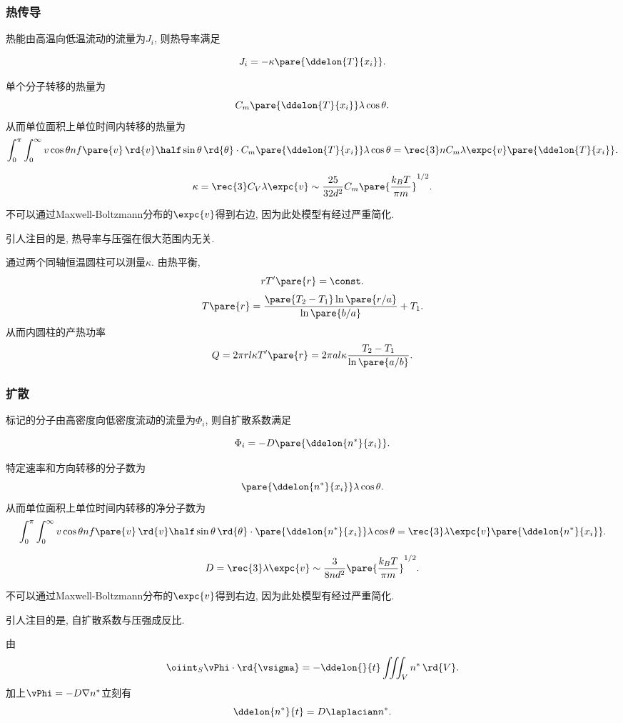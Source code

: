 \documentclass[../Thermal.tex]{subfiles}
\begin{document}
\subsubsection{热传导}
\begin{definition}[热导率]
热能由高温向低温流动的流量为$J_i$, 则热导率满足
\begin{finale}
\[ J_i = -\kappa \pare{\ddelon{T}{x_i}}. \]
\end{finale}
\end{definition}
单个分子转移的热量为
\[ C_m \pare{\ddelon{T}{x_i}}\lambda\cos\theta. \]
从而单位面积上单位时间内转移的热量为
\[ \int_0^\pi\int_0^\infty v\cos\theta nf\pare{v}\,\rd{v}\half\sin\theta\,\rd{\theta}\cdot C_m \pare{\ddelon{T}{x_i}}\lambda\cos\theta = \rec{3}nC_m\lambda\expc{v}\pare{\ddelon{T}{x_i}}. \]
\begin{finale}
\[ \kappa = \rec{3}C_V\lambda\expc{v} \sim \frac{25}{32d^2}C_m\pare{\frac{k_BT}{\pi m}}^{1/2}. \]
\end{finale}
\begin{pitfall}
不可以通过Maxwell-Boltzmann分布的$\expc{v}$得到右边, 因为此处模型有经过严重简化.
\end{pitfall}
引人注目的是, 热导率与压强在很大范围内无关.
\begin{ex}
通过两个同轴恒温圆柱可以测量$\kappa$. 由热平衡,
\[ rT'\pare{r} = \const. \]
\[ T\pare{r} = \frac{\pare{T_2-T_1}\ln\pare{r/a}}{\ln\pare{b/a}} + T_1. \]
从而内圆柱的产热功率
\[ Q = 2\pi rl\kappa T'\pare{r} = 2\pi al\kappa\frac{T_2-T_1}{\ln\pare{a/b}}. \]
\end{ex}
\subsubsection{扩散}
\begin{definition}[自扩散系数]
标记的分子由高密度向低密度流动的流量为$\Phi_i$, 则自扩散系数满足
\begin{finale}
\[ \Phi_i = -D\pare{\ddelon{n^*}{x_i}}. \]
\end{finale}
\end{definition}
特定速率和方向转移的分子数为
\[ \pare{\ddelon{n^*}{x_i}}\lambda\cos\theta. \]
从而单位面积上单位时间内转移的净分子数为
\[ \int_0^\pi\int_0^\infty v\cos\theta nf\pare{v}\,\rd{v}\half\sin\theta\,\rd{\theta}\cdot \pare{\ddelon{n^*}{x_i}}\lambda\cos\theta = \rec{3}\lambda\expc{v}\pare{\ddelon{n^*}{x_i}}. \]
\begin{finale}
\[ D = \rec{3}\lambda\expc{v} \sim \frac{3}{8nd^2}\pare{\frac{k_BT}{\pi m}}^{1/2}. \]
\end{finale}
\begin{pitfall}
不可以通过Maxwell-Boltzmann分布的$\expc{v}$得到右边, 因为此处模型有经过严重简化.
\end{pitfall}
引人注目的是, 自扩散系数与压强成反比.
\begin{remark}[三维扩散方程]
\label{rm:threedimensionaldiffusioneq}
由
\[ \oiint_S \vPhi\cdot\rd{\vsigma} = -\ddelon{}{t}\iiint_V n^*\,\rd{V}. \]
加上$\vPhi = -D\nabla n^*$立刻有
\[ \ddelon{n^*}{t} = D\laplacian n^*. \]
\end{remark}
\end{document}
